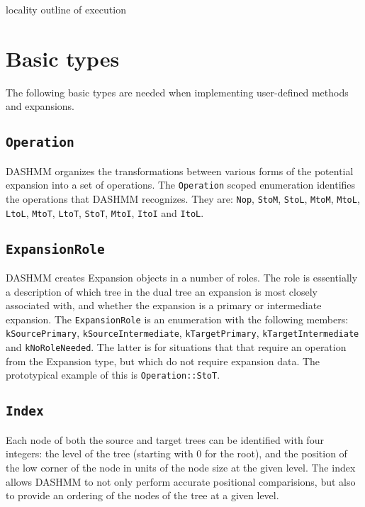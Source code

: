 locality
outline of execution



\section{Basic types}

The following basic types are needed when implementing user-defined methods and
expansions.

\subsection{\texttt{Operation}}

DASHMM organizes the transformations between various forms of the potential
expansion into a set of operations. The \texttt{Operation} scoped enumeration
identifies the operations that DASHMM recognizes. They are: \texttt{Nop},
\texttt{StoM}, \texttt{StoL}, \texttt{MtoM}, \texttt{MtoL}, \texttt{LtoL},
\texttt{MtoT}, \texttt{LtoT}, \texttt{StoT}, \texttt{MtoI}, \texttt{ItoI}
and \texttt{ItoL}.

\subsection{\texttt{ExpansionRole}}

DASHMM creates Expansion objects in a number of roles. The role is essentially
a description of which tree in the dual tree an expansion is most closely
associated with, and whether the expansion is a primary or intermediate
expansion.  The \texttt{ExpansionRole} is an enumeration with the following
members: \texttt{kSourcePrimary}, \texttt{kSourceIntermediate},
\texttt{kTargetPrimary}, \texttt{kTargetIntermediate} and
\texttt{kNoRoleNeeded}. The latter is for situations that that require an
operation from the Expansion type, but which do not require expansion data.
The prototypical example of this is \texttt{Operation::StoT}.

\subsection{\texttt{Index}}

Each node of both the source and target trees can be identified with four
integers: the level of the tree (starting with 0 for the root), and the
position of the low corner of the node in units of the node size at the given
level. The index allows DASHMM to not only perform accurate positional
comparisions, but also to provide an ordering of the nodes of the tree at a
given level.

